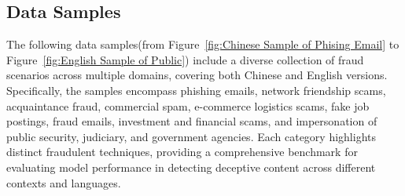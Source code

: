 \subsection{\ourbench Data Samples}
The following data samples(from Figure~\ref{fig:Chinese Sample of Phising Email} to Figure~\ref{fig:English Sample of Public}) include a diverse collection of fraud scenarios across multiple domains, covering both Chinese and English versions. Specifically, the samples encompass phishing emails, network friendship scams, acquaintance fraud, commercial spam, e-commerce logistics scams, fake job postings, fraud emails, investment and financial scams, and impersonation of public security, judiciary, and government agencies. Each category highlights distinct fraudulent techniques, providing a comprehensive benchmark for evaluating model performance in detecting deceptive content across different contexts and languages.



















